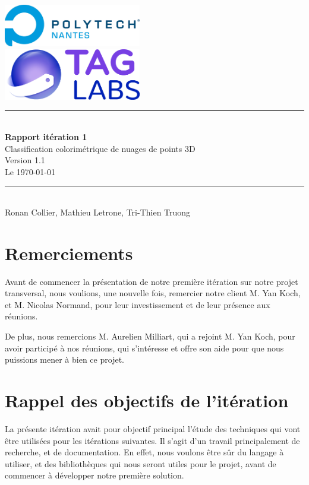 \documentclass[12pt,titlepage,french]{article}
\begin{document}

\begin{titlepage}
\newcommand{\HRule}{\rule{\linewidth}{0.5mm}}
\center

  \includegraphics[width=0.45\textwidth]{../../ressources/img_logos/logo_polytech.png}\\[1cm]

  \includegraphics[width=0.45\textwidth]{../../ressources/img_logos/logo_taglabs.png}


\HRule \\[0.4cm]
{ \huge \bfseries Rapport itération 1\\[0.15cm] }
Classification colorimétrique de nuages de points 3D\\
Version 1.1\\
Le \today \\
\HRule \\[1.5cm]
Ronan Collier,
Mathieu Letrone,
Tri-Thien Truong
\\[1cm]
\end{titlepage}

\tableofcontents %
\newpage
\listoffigures  %
\newpage

\section{Remerciements}

Avant de commencer la présentation de notre première itération sur notre projet transversal, nous voulions, une nouvelle fois, remercier notre client M. Yan Koch, et M. Nicolas Normand, pour leur investissement et de leur présence aux réunions.

De plus, nous remercions M. Aurelien Milliart, qui a rejoint M. Yan Koch, pour avoir participé à nos réunions, qui s'intéresse et offre son aide pour que nous puissions mener à bien ce projet.

\section{Rappel des objectifs de l'itération}
La présente itération avait pour objectif principal l'étude des techniques qui vont être utilisées pour les itérations suivantes.
Il s'agit d'un travail principalement de recherche, et de documentation. En effet, nous voulons être sûr du langage à utiliser, et des bibliothèques qui nous seront utiles pour le projet, avant de commencer à développer notre première solution.
\end{document}
